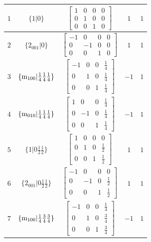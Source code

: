 \documentclass[fleqn,8pt]{jsarticle}
\begin{document}
\begin{longtable}{ccccc}
$ 1 $ & $ \{1|0\} $ & $ \begin{bmatrix} 1 & 0 & 0 & 0 \\ 0 & 1 & 0 & 0 \\ 0 & 0 & 1 & 0 \end{bmatrix} $ & $ 1 $ & $ 1 $ \\ \hline
$ 2 $ & $ \{2{}_{001}|0\} $ & $ \begin{bmatrix} -1 & 0 & 0 & 0 \\ 0 & -1 & 0 & 0 \\ 0 & 0 & 1 & 0 \end{bmatrix} $ & $ 1 $ & $ 1 $ \\ \hline
$ 3 $ & $ \{{\rm m}_{100}|\frac{1}{4} \frac{1}{4} \frac{1}{4}\} $ & $ \begin{bmatrix} -1 & 0 & 0 & \frac{1}{4} \\ 0 & 1 & 0 & \frac{1}{4} \\ 0 & 0 & 1 & \frac{1}{4} \end{bmatrix} $ & $ -1 $ & $ 1 $ \\ \hline
$ 4 $ & $ \{{\rm m}_{010}|\frac{1}{4} \frac{1}{4} \frac{1}{4}\} $ & $ \begin{bmatrix} 1 & 0 & 0 & \frac{1}{4} \\ 0 & -1 & 0 & \frac{1}{4} \\ 0 & 0 & 1 & \frac{1}{4} \end{bmatrix} $ & $ -1 $ & $ 1 $ \\ \hline
$ 5 $ & $ \{1|0 \frac{1}{2} \frac{1}{2}\} $ & $ \begin{bmatrix} 1 & 0 & 0 & 0 \\ 0 & 1 & 0 & \frac{1}{2} \\ 0 & 0 & 1 & \frac{1}{2} \end{bmatrix} $ & $ 1 $ & $ 1 $ \\ \hline
$ 6 $ & $ \{2{}_{001}|0 \frac{1}{2} \frac{1}{2}\} $ & $ \begin{bmatrix} -1 & 0 & 0 & 0 \\ 0 & -1 & 0 & \frac{1}{2} \\ 0 & 0 & 1 & \frac{1}{2} \end{bmatrix} $ & $ 1 $ & $ 1 $ \\ \hline
$ 7 $ & $ \{{\rm m}_{100}|\frac{1}{4} \frac{3}{4} \frac{3}{4}\} $ & $ \begin{bmatrix} -1 & 0 & 0 & \frac{1}{4} \\ 0 & 1 & 0 & \frac{3}{4} \\ 0 & 0 & 1 & \frac{3}{4} \end{bmatrix} $ & $ -1 $ & $ 1 $ \\ \hline

\end{longtable}
\end{document}
